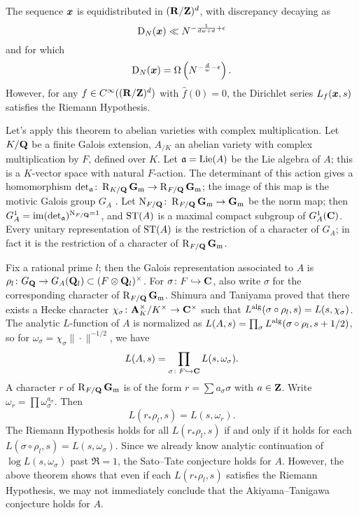 \begin{theorem}
The sequence ${\boldsymbol x}$ is equidistributed in $(\mathbf{R}/\mathbf{Z})^d$, with discrepancy 
decaying as 
\[
	\operatorname{D}_N({\boldsymbol x}) \ll N^{-\frac{1}{d w+d} + \epsilon} 
\]
and for which 
\[
	\operatorname{D}_N({\boldsymbol x}) = \Omega\left(N^{-\frac{d}{w} - \epsilon}\right) .
\]
However, for any $f\in C^\infty((\mathbf{R}/\mathbf{Z})^d)$ with $\widehat f(0)=0$, the 
Dirichlet series  $L_f({\boldsymbol x},s)$ satisfies the Riemann Hypothesis. 
\end{theorem}

Let's apply this theorem to abelian varieties with complex multiplication. Let 
$K/\mathbf{Q}$ be a finite Galois extension, $A_{/K}$ an abelian variety with complex 
multiplication by $F$, defined over $K$. Let $\mathfrak{a} = \operatorname{Lie}(A)$ be the Lie algebra 
of $A$; this is a $K$-vector space with natural $F$-action. The determinant of 
this action gives a homomorphism 
$\det_{\mathfrak{a}}\colon \operatorname{R}_{K/\mathbf{Q}}\mathbf{G}_\mathrm{m} \to \operatorname{R}_{F/\mathbf{Q}}\mathbf{G}_\mathrm{m}$; the image of this map is 
the motivic Galois group $G_A$ \cite{yu-2015}. Let 
$\operatorname{N}_{F/\mathbf{Q}}\colon \operatorname{R}_{F/\mathbf{Q}}\mathbf{G}_\mathrm{m} \to \mathbf{G}_\mathrm{m}$ be the norm map; then 
$G_A^1 = \operatorname{im}(\det_{\mathfrak{a}})^{\operatorname{N}_{F/\mathbf{Q}} = 1}$, and $\mathrm{ST}(A)$ is a maximal compact 
subgroup of $G_A^1(\mathbf{C})$. Every unitary representation of $\mathrm{ST}(A)$ is the 
restriction of a character of $G_A$; in fact it is the restriction of a 
character of $\operatorname{R}_{F/\mathbf{Q}} \mathbf{G}_\mathrm{m}$. 

Fix a rational prime $l$; then the Galois representation associated to $A$ is 
$\rho_l\colon G_{\mathbf{Q}} \to G_A(\mathbf{Q}_l)\subset (F\otimes\mathbf{Q}_l)^\times$. For 
$\sigma\colon F\hookrightarrow \mathbf{C}$, also 
write $\sigma$ for the corresponding character of $\operatorname{R}_{F/\mathbf{Q}}\mathbf{G}_\mathrm{m}$. Shimura and 
Taniyama proved \cite{serre-tate-1968} that there exists a Hecke character 
$\chi_\sigma\colon \mathbf{A}_K^\times / K^\times \to \mathbf{C}^\times$ such that 
$L^{\mathrm{alg}}(\sigma\circ \rho_l,s) = L(s,\chi_\sigma)$. The analytic $L$-function of 
$A$ is normalized as $L(A,s) = \prod_\sigma L^{\mathrm{alg}}(\sigma\circ \rho_l,s+1/2)$, 
so for $\omega_\sigma = \chi_\sigma \|\cdot\|^{-1/2}$, we have 
\[
	L(A,s) = \prod_{\sigma\colon F\hookrightarrow \mathbf{C}} L(s,\omega_\sigma) .
\]
A character $r$ of $\operatorname{R}_{F/\mathbf{Q}} \mathbf{G}_\mathrm{m}$ is of the form $r = \sum a_\sigma \sigma$ 
with $a\in \mathbf{Z}$. Write $\omega_r = \prod \omega_\sigma^{a_\sigma}$. Then 
\[
	L(r_\ast \rho_l,s) = L(s,\omega_r) .
\]
The Riemann Hypothesis holds for all $L(r_\ast \rho_l,s)$ if and only if it 
holds for each $L(\sigma \circ \rho_l,s) = L(s,\omega_\sigma)$. Since we 
already know analytic continuation of $\log L(s,\omega_\sigma)$ past 
$\Re = 1$, the Sato--Tate conjecture holds for $A$. However, the above theorem 
shows that even if each $L(r_\ast \rho_l,s)$ satisfies the Riemann Hypothesis, 
we may not immediately conclude that the Akiyama--Tanigawa conjecture holds for 
$A$. 

